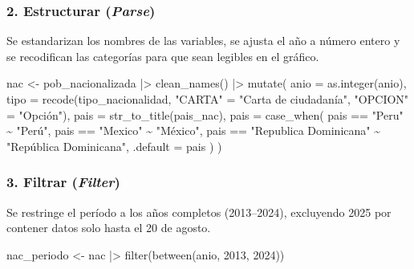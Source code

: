 \documentclass[
  letterpaper,
  DIV=11,
  numbers=noendperiod]{scrartcl}
\newenvironment{Shaded}{\begin{snugshade}}{\end{snugshade}}
\newcommand{\AttributeTok}[1]{\textcolor[rgb]{0.40,0.45,0.13}{#1}}
\newcommand{\DecValTok}[1]{\textcolor[rgb]{0.68,0.00,0.00}{#1}}
\newcommand{\FunctionTok}[1]{\textcolor[rgb]{0.28,0.35,0.67}{#1}}
\newcommand{\NormalTok}[1]{\textcolor[rgb]{0.00,0.23,0.31}{#1}}
\newcommand{\OtherTok}[1]{\textcolor[rgb]{0.00,0.23,0.31}{#1}}
\newcommand{\SpecialCharTok}[1]{\textcolor[rgb]{0.37,0.37,0.37}{#1}}
\newcommand{\StringTok}[1]{\textcolor[rgb]{0.13,0.47,0.30}{#1}}
\begin{document}
\subsubsection{\texorpdfstring{2. Estructurar
(\emph{Parse})}{2. Estructurar (Parse)}}\label{estructurar-parse}

Se estandarizan los nombres de las variables, se ajusta el año a número
entero y se recodifican las categorías para que sean legibles en el
gráfico.

\begin{Shaded}
\begin{Highlighting}[]
\NormalTok{nac }\OtherTok{\textless{}{-}}\NormalTok{ pob\_nacionalizada }\SpecialCharTok{|\textgreater{}}
  \FunctionTok{clean\_names}\NormalTok{() }\SpecialCharTok{|\textgreater{}} 
  \FunctionTok{mutate}\NormalTok{(}
    \AttributeTok{anio =} \FunctionTok{as.integer}\NormalTok{(anio),}
    \AttributeTok{tipo =} \FunctionTok{recode}\NormalTok{(tipo\_nacionalidad,}
                  \StringTok{"CARTA"}  \OtherTok{=} \StringTok{"Carta de ciudadanía"}\NormalTok{,}
                  \StringTok{"OPCION"} \OtherTok{=} \StringTok{"Opción"}\NormalTok{),}
    \AttributeTok{pais =} \FunctionTok{str\_to\_title}\NormalTok{(pais\_nac),}
    \AttributeTok{pais =} \FunctionTok{case\_when}\NormalTok{(}
\NormalTok{                    pais }\SpecialCharTok{==} \StringTok{"Peru"} \SpecialCharTok{\textasciitilde{}} \StringTok{"Perú"}\NormalTok{,}
\NormalTok{                    pais }\SpecialCharTok{==} \StringTok{"Mexico"} \SpecialCharTok{\textasciitilde{}} \StringTok{"México"}\NormalTok{,}
\NormalTok{                    pais }\SpecialCharTok{==} \StringTok{"Republica Dominicana"} \SpecialCharTok{\textasciitilde{}} \StringTok{"República Dominicana"}\NormalTok{,}
                    \AttributeTok{.default =}\NormalTok{ pais}
\NormalTok{                  )}
\NormalTok{  )}
\end{Highlighting}
\end{Shaded}

\subsubsection{\texorpdfstring{3. Filtrar
(\emph{Filter})}{3. Filtrar (Filter)}}\label{filtrar-filter}

Se restringe el período a los años completos (2013--2024), excluyendo
2025 por contener datos solo hasta el 20 de agosto.

\begin{Shaded}
\begin{Highlighting}[]
\NormalTok{nac\_periodo }\OtherTok{\textless{}{-}}\NormalTok{ nac }\SpecialCharTok{|\textgreater{}}
  \FunctionTok{filter}\NormalTok{(}\FunctionTok{between}\NormalTok{(anio, }\DecValTok{2013}\NormalTok{, }\DecValTok{2024}\NormalTok{))}
\end{Highlighting}
\end{Shaded}
\end{document}
